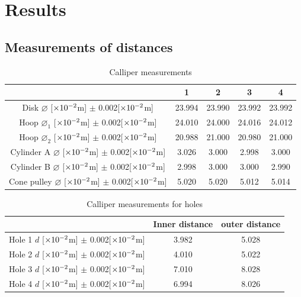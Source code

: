 \section{Results}
\subsection{Measurements of distances}
    \begin{table}[H] \small
        \centering
        \begin{tabular}{|c|c|c|c|c|}
        \hline
            & 1 & 2 & 3 & 4\\\hline
            Disk $\varnothing$ [$\times10^{-2}$m] $\pm$ 0.002[$\times10^{-2}$m] & 23.994 & 23.990 & 23.992 & 23.992\\\hline
            Hoop $\varnothing_1$ [$\times10^{-2}$m] $\pm$ 0.002[$\times10^{-2}$m] & 24.010 & 24.000 & 24.016 & 24.012\\\hline
            Hoop $\varnothing_2$ [$\times10^{-2}$m] $\pm$ 0.002[$\times10^{-2}$m] & 20.988 & 21.000 & 20.980 & 21.000\\\hline
            Cylinder A $\varnothing$ [$\times10^{-2}$m] $\pm$ 0.002[$\times10^{-2}$m] & 3.026 & 3.000 & 2.998 & 3.000\\\hline
            Cylinder B $\varnothing$ [$\times10^{-2}$m] $\pm$ 0.002[$\times10^{-2}$m] & 2.998 & 3.000 & 3.000 & 2.990\\\hline
            Cone pulley $\varnothing$ [$\times10^{-2}$m] $\pm$ 0.002[$\times10^{-2}$m] & 5.020 & 5.020 & 5.012 & 5.014\\\hline
        \end{tabular}
        \caption{Calliper measurements}\label{table_calliper}
    \end{table}
    
    \begin{table}[H] \small
        \centering
        \begin{tabular}{|c|c|c|}
        \hline
            & Inner distance & outer distance\\\hline
            Hole 1 $d$ [$\times10^{-2}$m] $\pm$ 0.002[$\times10^{-2}$m] & 3.982 & 5.028\\\hline
            Hole 2 $d$ [$\times10^{-2}$m] $\pm$ 0.002[$\times10^{-2}$m] & 4.010 & 5.022\\\hline
            Hole 3 $d$ [$\times10^{-2}$m] $\pm$ 0.002[$\times10^{-2}$m] & 7.010 & 8.028\\\hline
            Hole 4 $d$ [$\times10^{-2}$m] $\pm$ 0.002[$\times10^{-2}$m] & 6.994 & 8.026\\\hline
        \end{tabular}
        \caption{Calliper measurements for holes}\label{table_hole}
    \end{table}

